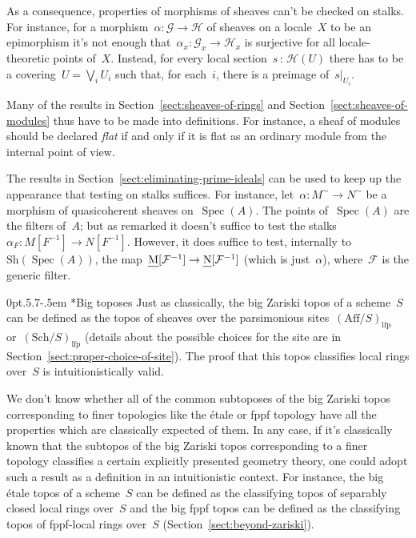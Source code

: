 \documentclass[10pt,reqno,a4paper]{amsbook}
\makeatletter
\theoremstyle{definition}
\theoremstyle{plain}
\theoremstyle{remark}
\newcommand{\F}{\mathcal{F}}
\newcommand{\G}{\mathcal{G}}
\renewcommand{\H}{\mathcal{H}}
\let\oldul\ul
\renewcommand{\ul}[1]{\text{\oldul{$#1$}}}
\newcommand{\Sh}{\mathrm{Sh}}
\newcommand{\Sch}{\mathrm{Sch}}
\newcommand{\Aff}{\mathrm{Aff}}
\newcommand{\lfp}{\mathrm{lfp}}
\DeclareMathOperator{\Spec}{Spec}
\newcommand{\?}{\,{:}\,}
\renewcommand{\_}{\mathpunct{.}\,}
\def\subsection{\@startsection{subsection}{2}%
  {0pt}{.5\linespacing\@plus.7\linespacing}{-.5em}%
  {\normalfont\bfseries}}
\makeatother
\begin{document}
{As a consequence, properties of morphisms of sheaves can't be checked on
stalks. For instance, for a morphism~$\alpha : \G \to \H$ of sheaves on a
locale~$X$ to be an epimorphism it's not enough that~$\alpha_x : \G_x \to \H_x$
is surjective for all locale-theoretic points of~$X$. Instead, for every local
section~$s \? \H(U)$ there has to be a covering~$U = \bigvee_i U_i$ such that,
for each~$i$, there is a preimage of~$s|_{U_i}$.

Many of the results in Section~\ref{sect:sheaves-of-rings} and
Section~\ref{sect:sheaves-of-modules} thus have to be made into definitions.
For instance, a sheaf of modules should be declared \emph{flat} if and only if
it is flat as an ordinary module from the internal point of view.

The results in Section~\ref{sect:eliminating-prime-ideals} can be used to keep
up the appearance that testing on stalks suffices. For instance, let~$\alpha :
M^\sim \to N^\sim$ be a morphism of quasicoherent sheaves on~$\Spec(A)$. The
points of~$\Spec(A)$ are the filters of~$A$; but as remarked it doesn't suffice
to test the stalks~$\alpha_F : M[F^{-1}] \to N[F^{-1}]$. However, it does
suffice to test, internally to~$\Sh(\Spec(A))$, the map~$\ul{M}[\F^{-1}] \to
\ul{N}[\F^{-1}]$ (which is just~$\alpha$), where~$\F$ is the generic filter.


\subsection*{Big toposes} Just as classically, the big Zariski topos of a
scheme~$S$ can be defined as the topos of sheaves over the parsimonious
sites~$(\Aff/S)_\lfp$ or~$(\Sch/S)_\lfp$ (details about the possible choices
for the site are in Section~\ref{sect:proper-choice-of-site}). The proof that
this topos classifies local rings over~$S$ is intuitionistically valid.

We don't know whether all of the common subtoposes of the big Zariski topos
corresponding to finer topologies like the étale or fppf topology have all the
properties which are classically expected of them. In any case, if it's
classically known that the subtopos of the big Zariski topos corresponding to
a finer topology classifies a certain explicitly presented geometry
theory, one could adopt such a result as a definition in an intuitionistic
context. For instance, the big étale topos of a scheme~$S$ can be defined as
the classifying topos of separably closed local rings over~$S$ and the big fppf
topos can be defined as the classifying topos of fppf-local rings over~$S$
(Section~\ref{sect:beyond-zariski}).


}
\end{document}
